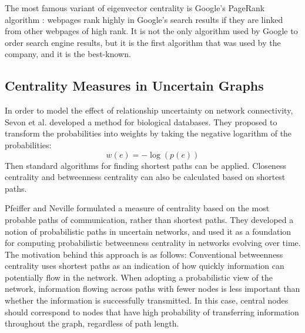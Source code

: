 \documentclass[\main/thesis.tex]{subfiles}
\begin{document}
The most famous variant of eigenvector centrality is Google's PageRank algorithm \cite{page1999pagerank}: webpages rank highly in Google’s search results if they are linked from other webpages of high rank. It is not the only algorithm used by Google to order search engine results, but it is the first algorithm that was used by the company, and it is the best-known.

\subsection{Centrality Measures in Uncertain Graphs}
In order to model the effect of relationship uncertainty on network connectivity, Sevon et al. \cite{sevon2006link} developed a method for biological databases. They proposed to transform the probabilities into weights by taking the negative logarithm of the probabilities:
\begin{equation}
w(e) = -\log(p(e))
\end{equation}
Then standard algorithms for finding shortest paths can be applied. Closeness centrality and betweenness centrality can also be calculated based on shortest paths.

Pfeiffer and Neville \cite{pfeiffer2010probabilistic} formulated a measure of centrality based on the most probable paths of communication, rather than shortest paths. They developed a notion of probabilistic paths in uncertain networks, and used it as a foundation for computing probabilistic betweenness centrality in networks evolving over time. The motivation behind this approach is as follows: Conventional betweenness centrality uses shortest paths as an indication of how quickly information can potentially flow in the network. When adopting a probabilistic view of the network, information flowing across paths with fewer nodes is less important than whether the information is successfully transmitted. In this case, central nodes should correspond to nodes that have high probability of transferring information throughout the graph, regardless of path length.
\end{document}
